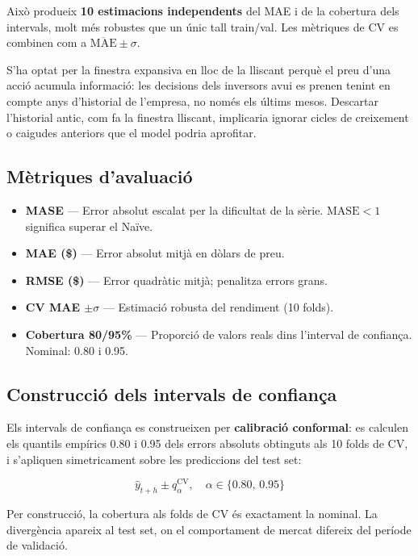 \documentclass[12pt,a4paper]{article}
\begin{document}
Això produeix \textbf{10 estimacions independents} del MAE i de la cobertura dels intervals,
molt més robustes que un únic tall train/val. Les mètriques de CV es combinen com a
$\overline{\text{MAE}} \pm \sigma$.

S'ha optat per la finestra expansiva en lloc de la lliscant perquè el preu d'una acció
acumula informació: les decisions dels inversors avui es prenen tenint en compte anys
d'historial de l'empresa, no només els últims mesos. Descartar l'historial antic,
com fa la finestra lliscant, implicaria ignorar cicles de creixement o caigudes
anteriors que el model podria aprofitar.

\subsection{Mètriques d'avaluació}

\begin{itemize}
  \item \textbf{MASE} — Error absolut escalat per la dificultat de la sèrie. $\text{MASE} < 1$ significa superar el Naïve.
  \item \textbf{MAE (\$)} — Error absolut mitjà en dòlars de preu.
  \item \textbf{RMSE (\$)} — Error quadràtic mitjà; penalitza errors grans.
  \item \textbf{CV MAE $\pm\sigma$} — Estimació robusta del rendiment (10 folds).
  \item \textbf{Cobertura 80/95\%} — Proporció de valors reals dins l'interval de confiança. Nominal: 0.80 i 0.95.
\end{itemize}

\subsection{Construcció dels intervals de confiança}

Els intervals de confiança es construeixen per \textbf{calibració conformal}: es calculen
els quantils empírics 0.80 i 0.95 dels errors absoluts obtinguts als 10 folds de CV,
i s'apliquen simetricament sobre les prediccions del test set:

\[
  \hat{y}_{t+h} \pm q_{\alpha}^{\text{CV}}, \quad \alpha \in \{0.80,\, 0.95\}
\]

Per construcció, la cobertura als folds de CV és exactament la nominal. La divergència
apareix al test set, on el comportament de mercat difereix del període de validació.

\end{document}
